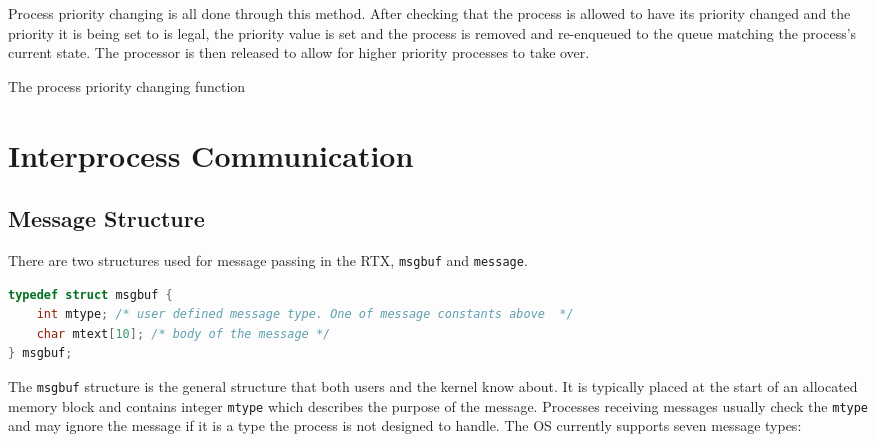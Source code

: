 \documentclass[12pt]{report}
\begin{document}
Process priority changing is all done through this method. After checking that the process is allowed to have its priority changed and the priority it is being set to is legal, the priority value is set and the process is removed and re-enqueued to the queue matching the process's current state. The processor is then released to allow for higher priority processes to take over.

\begin{algorithm}
  \caption{The process priority changing function}
  \begin{algorithmic}[1]
		\EndIf
    \EndProcedure
  \end{algorithmic}
\end{algorithm}

\pagebreak


\section{Interprocess Communication}

\subsection{Message Structure}

There are two structures used for message passing in the RTX, \texttt{msgbuf} and
\texttt{message}. \\
\begin{lstlisting}[language=C, frame=single]
typedef struct msgbuf {
	int mtype; /* user defined message type. One of message constants above  */
	char mtext[10]; /* body of the message */
} msgbuf;
\end{lstlisting}
The \texttt{msgbuf} structure is the general structure that both users and the
kernel know about. It is typically placed at the start of an allocated memory block
and contains integer \texttt{mtype} which describes the purpose of the message. Processes receiving messages usually check the {\tt mtype} and may ignore the message if it is a type the process is not designed to handle. The OS currently supports seven message types:
\end{document}
